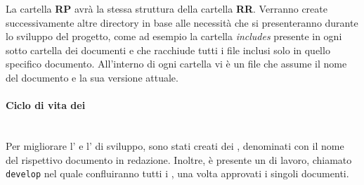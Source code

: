 La cartella \textbf{RP} avrà la stessa struttura della cartella \textbf{RR}. Verranno create successivamente altre directory in base alle necessità che si presenteranno durante lo sviluppo del progetto, come ad esempio la cartella \emph{includes} presente in ogni sotto cartella dei documenti e che racchiude tutti i file inclusi solo in quello specifico documento. All’interno di ogni cartella vi è un file  che assume il nome del documento e la sua versione attuale.
\paragraph{Ciclo di vita dei }\mbox{}\\[0.4cm]
Per migliorare l' e l' di sviluppo, sono stati creati dei , denominati con il nome del rispettivo documento in redazione.
Inoltre, è presente un  di lavoro, chiamato \texttt{develop} nel quale confluiranno tutti i , una volta approvati i singoli documenti.

